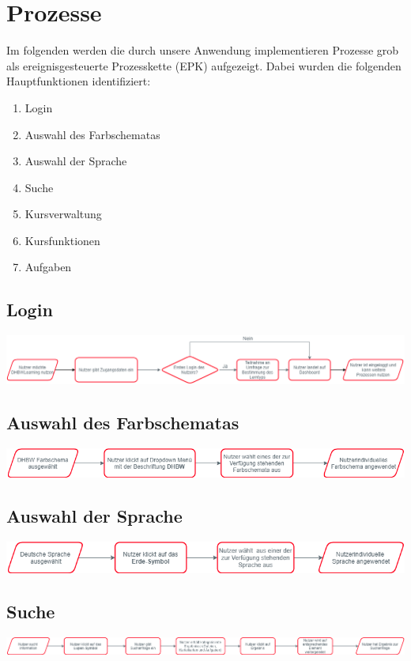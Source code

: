 \chapter{Prozesse}
Im folgenden werden die durch unsere Anwendung implementieren Prozesse grob als ereignisgesteuerte Prozesskette (EPK) aufgezeigt. Dabei wurden die folgenden Hauptfunktionen identifiziert:
\begin{enumerate}
	\item Login
	\item Auswahl des Farbschematas
	\item Auswahl der Sprache
	\item Suche
	\item Kursverwaltung
	\item Kursfunktionen
	\item Aufgaben
\end{enumerate}

\section{Login}
	\includegraphics[width=\linewidth, keepaspectratio]{img/Prozesse/login}
\section{Auswahl des Farbschematas}
	\includegraphics[width=\linewidth, keepaspectratio]{img/Prozesse/color}
\section{Auswahl der Sprache}
	\includegraphics[width=\linewidth, keepaspectratio]{img/Prozesse/language}
\section{Suche}
	\includegraphics[width=\linewidth, keepaspectratio]{img/Prozesse/search}
